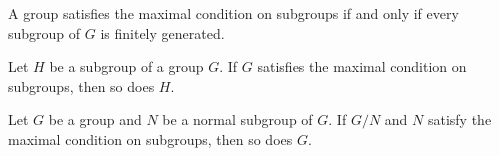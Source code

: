 
\begin{exercise}
\label{xca:MAX=fg}
A group satisfies the maximal condition on subgroups if and only if
every subgroup of $G$ is finitely generated. 
\end{exercise}




\begin{exercise}
Let $H$ be a subgroup of a group $G$. If $G$ satisfies 
the maximal condition on subgroups, then so does $H$. 
\end{exercise}

\begin{exercise}
\label{xca:max:G/N}
Let $G$ be a group and $N$ be a normal subgroup of $G$. If $G/N$ and $N$
satisfy the maximal condition on subgroups, then so does $G$.
\end{exercise}

